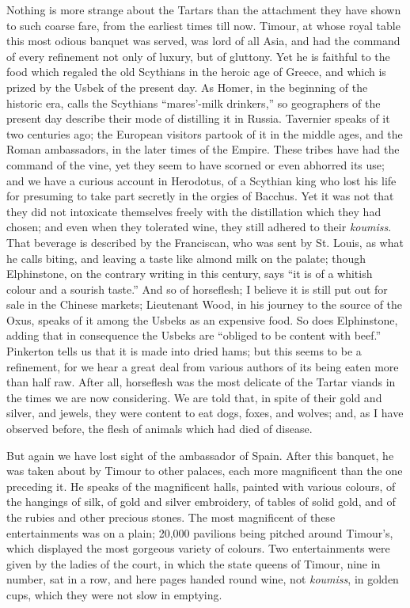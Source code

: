 Nothing is more strange about
the Tartars than the attachment they have shown to such coarse fare,
from the earliest times till now. Timour, at whose royal table this
most odious banquet was served, was lord of all Asia, and had the
command of every refinement not only of luxury, but of gluttony. Yet
he is faithful to the food which regaled the old Scythians in the
heroic age of Greece, and which is prized by the Usbek of the present
day. As Homer, in the beginning of the historic era, calls the
Scythians ``mares'-milk drinkers,'' so geographers of the present day
describe their mode of distilling it in Russia. Tavernier speaks of it
two centuries ago; the European visitors partook of it in the middle ages, and the Roman ambassadors, in the later times of the
Empire. These tribes have had the command of the vine, yet they seem
to have scorned or even abhorred its use; and we have a curious
account in Herodotus, of a Scythian king who lost his life for
presuming to take part secretly in the orgies of Bacchus. Yet it was
not that they did not intoxicate themselves freely with the
distillation which they had chosen; and even when they tolerated wine,
they still adhered to their \emph{koumiss}. That beverage is described
by the Franciscan, who was sent by St. Louis, as what he calls biting,
and leaving a taste like almond milk on the palate; though Elphinstone,
on the contrary writing in this century, says ``it is of a whitish
colour and a sourish taste.'' And so of horseflesh; I believe it is
still put out for sale in the Chinese markets; Lieutenant Wood, in his
journey to the source of the Oxus, speaks of it among the Usbeks as an
expensive food. So does Elphinstone, adding that in consequence the
Usbeks are ``obliged to be content with beef.'' Pinkerton tells us that
it is made into dried hams; but this seems to be a refinement, for we
hear a great deal from various authors of its being eaten more than
half raw. After all, horseflesh was the most delicate of the Tartar
viands in the times we are now considering. We are told that, in spite
of their gold and silver, and jewels, they were content to eat dogs,
foxes, and wolves; and, as I have observed before, the flesh of
animals which had died of disease.

But again we have lost sight
of the ambassador of Spain. After this banquet, he was taken about by
Timour to other palaces, each more magnificent than the one preceding
it. He speaks of the magnificent halls, painted with various colours,
of the hangings of silk, of gold and silver embroidery, of tables
of solid gold, and of the rubies and other precious stones. The most
magnificent of these entertainments was on a plain; 20,000 pavilions
being pitched around Timour's, which displayed the most gorgeous
variety of colours. Two entertainments were given by the ladies of the
court, in which the state queens of Timour, nine in number, sat in a
row, and here pages handed round wine, not \emph{koumiss}, in golden
cups, which they were not slow in emptying.

